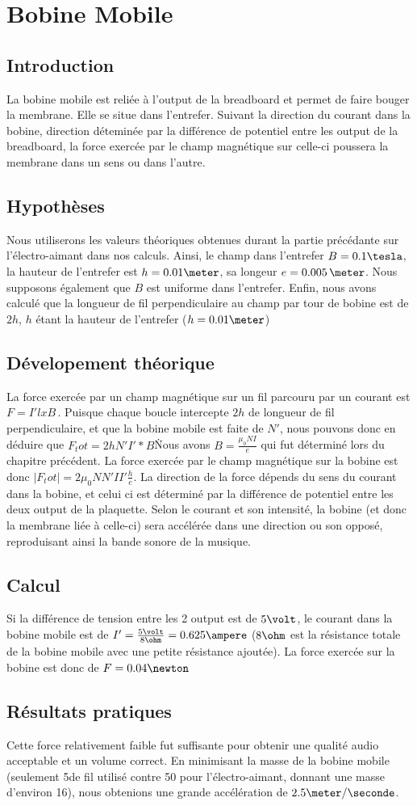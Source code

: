 \chapter{Bobine Mobile}
\section{Introduction}
La bobine mobile est reliée à l'output de la breadboard et permet de faire bouger la membrane. Elle se situe dans 
l'entrefer. Suivant la direction du courant dans la bobine, direction déteminée par la différence de potentiel
entre les output de la breadboard, la force exercée par le champ magnétique sur celle-ci poussera la 
membrane dans un sens ou dans l'autre.
\section{Hypothèses}
Nous utiliserons les valeurs théoriques obtenues durant la partie précédante sur l'électro-aimant dans nos calculs.
Ainsi, le champ dans l'entrefer $B = 0.1\tesla$, la hauteur de l'entrefer est $h = 0.01\meter$, sa longeur 
$e = 0.005\,\meter$. Nous supposons également que $B$ est uniforme dans l'entrefer. Enfin, nous avons 
calculé que la longueur de fil perpendiculaire au champ par tour de bobine est de $2h$, $h$ étant 
la hauteur de l'entrefer ($h = 0.01\meter$) 
\section{Dévelopement théorique}
La force exercée par un champ magnétique sur un fil parcouru par un courant est $F =  I' l x B$\,. Puisque 
chaque boucle intercepte $2h$ de longueur de fil perpendiculaire, et que la bobine mobile est faite de $N'$, nous pouvons
donc en déduire que $F_tot = 2h N' I' * B$\. Nous avons $B = \frac{\mu_0 N I}{e}$ qui fut déterminé 
lors du chapitre précédent. La force exercée par le champ magnétique sur la bobine est donc 
$ |F_tot| = 2 \mu_0 N N' I I' \frac{h}{e}$. La direction de la force dépends du sens du courant dans la bobine, et 
celui ci est déterminé par la différence de potentiel entre les deux output de la plaquette. Selon le courant et son
intensité, la bobine (et donc la membrane liée à celle-ci) sera accélérée dans une direction ou son opposé, reproduisant 
ainsi la bande sonore de la musique.
\section{Calcul}
Si la différence de tension entre les 2 output est de $5\volt$, le courant dans la bobine mobile est de 
$I' = \frac{5\volt}{8\ohm} = 0.625\ampere$ ($8\ohm$ est la résistance totale de la bobine mobile avec une petite 
résistance ajoutée). La force exercée sur la bobine est donc de $F = 0.04 \newton$
\section{Résultats pratiques}
Cette force relativement faible fut suffisante pour obtenir une qualité audio acceptable et un volume correct. 
En minimisant la masse de la bobine mobile (seulement 5\meter de fil utilisé contre 50 pour l'électro-aimant, 
donnant une masse d'environ 16\gramme), nous obtenions une grande accélération de $2.5\meter / \seconde$. 